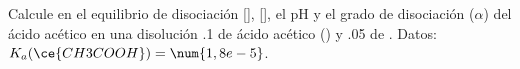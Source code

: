 Calcule en el equilibrio de disociación [], [], el pH y el grado de disociación ($\alpha$) del ácido acético en una disolución \SI{,1}{\Molar} de ácido acético () y \SI{,05}{\Molar} de . Datos: $K_a(\ce{CH3COOH})=\num{1,8e-5}$.
